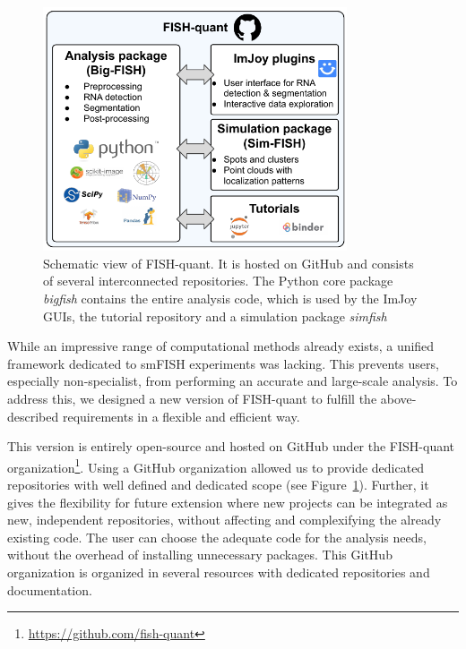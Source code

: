 \begin{figure}[h]
    \centering
    \includegraphics[width=0.8\textwidth]{figures/chapter1/schema_fishquant}
    \caption{Schematic view of FISH-quant.
	It is hosted on GitHub and consists of several interconnected repositories.
	The Python core package \emph{bigfish} contains the entire analysis code, which is used by the ImJoy GUIs, the tutorial repository and a simulation package \emph{simfish}}
    \label{fig:fishquant}
\end{figure}

While an impressive range of computational methods already exists, a unified framework dedicated to \ac{smFISH} experiments was lacking.
This prevents users, especially non-specialist, from performing an accurate and large-scale analysis.
To address this, we designed a new version of FISH-quant to fulfill the above-described requirements in a flexible and efficient way.

This version is entirely open-source and hosted on GitHub under the FISH-quant organization\footnote{\url{https://github.com/fish-quant}}.
Using a GitHub organization allowed us to provide dedicated repositories with well defined and dedicated scope (see Figure~\ref{fig:fishquant}).
Further, it gives the flexibility for future extension where new projects can be integrated as new, independent repositories, without affecting and complexifying the already existing code.
The user can choose the adequate code for the analysis needs, without the overhead of installing unnecessary packages.
This GitHub organization is organized in several resources with dedicated repositories and documentation.

